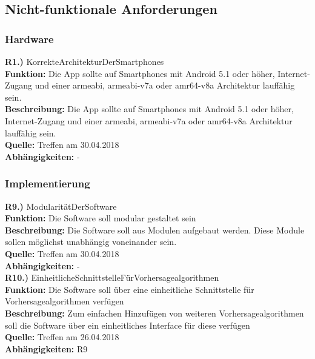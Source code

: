 \documentclass[12pt]{article} %
\begin{document}
\subsection{Nicht-funktionale Anforderungen}

\subsubsection{Hardware}

\textbf{R1.)} KorrekteArchitekturDerSmartphones \\
\textbf{Funktion:} Die App sollte auf Smartphones mit Android 5.1 oder höher, Internet-Zugang und einer armeabi, armeabi-v7a oder amr64-v8a Architektur lauffähig sein. \\
\textbf{Beschreibung:} Die App sollte auf Smartphones mit Android 5.1 oder höher, Internet-Zugang und einer armeabi, armeabi-v7a oder amr64-v8a Architektur lauffähig sein. \\
\textbf{Quelle:} Treffen am 30.04.2018 \\
\textbf{Abhängigkeiten:} - \\

\subsubsection{Implementierung}

\textbf{R9.)} ModularitätDerSoftware\\
\textbf{Funktion:} Die Software soll modular gestaltet sein\\
\textbf{Beschreibung:} Die Software soll aus Modulen aufgebaut werden. Diese Module sollen möglichst unabhängig voneinander sein.\\
\textbf{Quelle:} Treffen am 30.04.2018\\
\textbf{Abhängigkeiten:} -\\

\textbf{R10.)} EinheitlicheSchnittstelleFürVorhersagealgorithmen\\
\textbf{Funktion:} Die Software soll über eine einheitliche Schnittstelle für Vorhersagealgorithmen verfügen\\
\textbf{Beschreibung:} Zum einfachen Hinzufügen von weiteren Vorhersagealgorithmen soll die Software über ein einheitliches Interface für diese verfügen\\
\textbf{Quelle:} Treffen am 26.04.2018\\
\textbf{Abhängigkeiten:} R9\\
\end{document}

